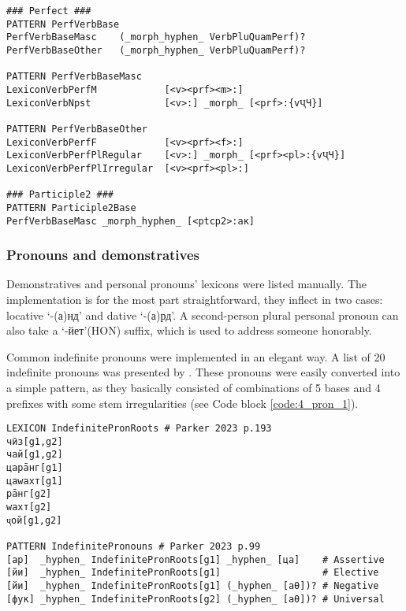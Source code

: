 \begin{code_frame}[float,floatplacement=!h]
    \begin{footnotesize}\codespacing
    \begin{verbatim}
### Perfect ###
PATTERN PerfVerbBase
PerfVerbBaseMasc    (_morph_hyphen_ VerbPluQuamPerf)?
PerfVerbBaseOther   (_morph_hyphen_ VerbPluQuamPerf)?

PATTERN PerfVerbBaseMasc
LexiconVerbPerfM            [<v><prf><m>:]
LexiconVerbNpst             [<v>:] _morph_ [<prf>:{vҶЧ}]

PATTERN PerfVerbBaseOther
LexiconVerbPerfF            [<v><prf><f>:]
LexiconVerbPerfPlRegular    [<v>:] _morph_ [<prf><pl>:{vҶЧ}]
LexiconVerbPerfPlIrregular  [<v><prf><pl>:]

### Participle2 ###
PATTERN Participle2Base
PerfVerbBaseMasc _morph_hyphen_ [<ptcp2>:ак]               
    \end{verbatim}
    \end{footnotesize}
    \tcblower
    \label{code:4_verb_2}
\end{code_frame}

\subsubsection*{Pronouns and demonstratives}
Demonstratives and personal pronouns' lexicons were listed manually. The implementation is for the most part straightforward, they inflect in two cases: locative `-(а)нд' and dative `-(а)рд'. A second-person plural personal pronoun can also take a `-йет'(HON) suffix, which is used to address someone honorably.

Common indefinite pronouns were implemented in an elegant way. A list of 20 indefinite pronouns was presented by \textcite[Table 6.4]{parker_shughni_2023}. These pronouns were easily converted into a simple pattern, as they basically consisted of combinations of 5 bases and 4 prefixes with some stem irregularities (see Code block \ref{code:4_pron_1}).

\begin{code_frame}[float,floatplacement=!h]
    \begin{footnotesize}\codespacing
    \begin{verbatim}
LEXICON IndefinitePronRoots # Parker 2023 p.193
чӣз[g1,g2]
чай[g1,g2]
царāнг[g1]
цаwахт[g1]
рāнг[g2]
wахт[g2]
ҷой[g1,g2]

PATTERN IndefinitePronouns # Parker 2023 p.99
[ар]  _hyphen_ IndefinitePronRoots[g1] _hyphen_ [ца]    # Assertive
[йи]  _hyphen_ IndefinitePronRoots[g1]                  # Elective
[йи]  _hyphen_ IndefinitePronRoots[g1] (_hyphen_ [аθ])? # Negative
[фук] _hyphen_ IndefinitePronRoots[g2] (_hyphen_ [аθ])? # Universal             
    \end{verbatim}
    \end{footnotesize}
    \tcblower
    \label{code:4_pron_1}
\end{code_frame}

